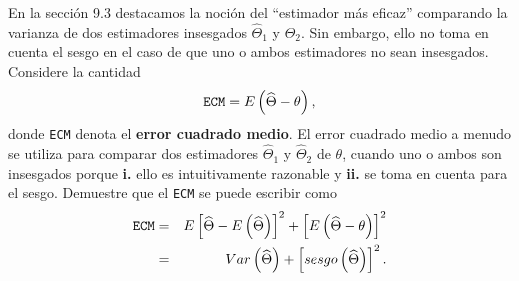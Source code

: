 \begin{enunciado}
 En la secci\'on 9.3 destacamos la noci\'on del ``estimador m\'as eficaz'' comparando la varianza de dos estimadores insesgados $\widehat{\Theta}_1$ y $\widehat{\Theta}_2$. Sin embargo, ello no toma en cuenta el sesgo en el caso de que uno o ambos estimadores no sean insesgados. Considere la cantidad
 \begin{equation*}
  \text{\texttt{ECM}} = E\left( \widehat{\Theta} - \theta \right),
 \end{equation*}
 donde \texttt{ECM} denota el \textbf{error cuadrado medio}. El error cuadrado medio a menudo se utiliza para comparar dos estimadores $\widehat{\Theta}_1$ y $\widehat{\Theta}_2$ de $\theta$, cuando uno o ambos son insesgados porque \textbf{i.} ello es intuitivamente razonable y \textbf{ii.} se toma en cuenta para el sesgo. Demuestre que el \texttt{ECM} se puede escribir como
 \begin{eqnarray*}
  \text{\texttt{ECM}} 
  & = & E\left[ \widehat{\Theta} - E\left( \widehat{\Theta} \right) \right]^2 + \left[ E\left( \widehat{\Theta} - \theta \right) \right]^2 \\
  & = & Var\left( \widehat{\Theta} \right) + \left[ sesgo\left( \widehat{\Theta} \right) \right]^2.
 \end{eqnarray*}

\end{enunciado}

